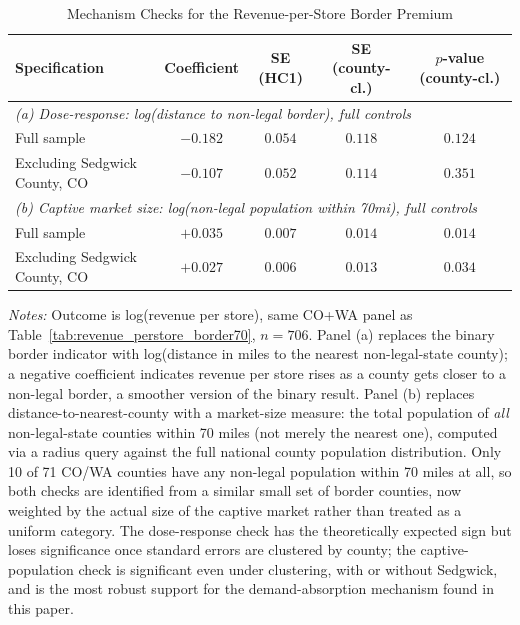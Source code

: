 \begin{table}[htbp]
\centering
\caption{Mechanism Checks for the Revenue-per-Store Border Premium}
\label{tab:revenue_perstore_mechanism}
\begin{tabular}{lcccc}
\toprule
Specification & Coefficient & SE (HC1) & SE (county-cl.) & $p$-value (county-cl.) \\
\midrule
\multicolumn{5}{l}{\textit{(a) Dose-response: log(distance to non-legal border), full controls}} \\
Full sample & $-0.182$ & $0.054$ & $0.118$ & $0.124$ \\
Excluding Sedgwick County, CO & $-0.107$ & $0.052$ & $0.114$ & $0.351$ \\
\midrule
\multicolumn{5}{l}{\textit{(b) Captive market size: log(non-legal population within 70mi), full controls}} \\
Full sample & $+0.035$ & $0.007$ & $0.014$ & $0.014$ \\
Excluding Sedgwick County, CO & $+0.027$ & $0.006$ & $0.013$ & $0.034$ \\
\bottomrule
\end{tabular}
\begin{minipage}{0.95\textwidth}
\vspace{0.3em}
\footnotesize
\textit{Notes:} Outcome is log(revenue per store), same CO+WA panel as Table~\ref{tab:revenue_perstore_border70},
$n=706$. Panel (a) replaces the binary border indicator with log(distance in miles to the nearest
non-legal-state county); a negative coefficient indicates revenue per store rises as a county gets closer
to a non-legal border, a smoother version of the binary result. Panel (b) replaces distance-to-nearest-county
with a market-size measure: the total population of \emph{all} non-legal-state counties within 70 miles
(not merely the nearest one), computed via a radius query against the full national county population
distribution. Only 10 of 71 CO/WA counties have any non-legal population within 70 miles at all, so both
checks are identified from a similar small set of border counties, now weighted by the actual size of the
captive market rather than treated as a uniform category. The dose-response check has the theoretically
expected sign but loses significance once standard errors are clustered by county; the captive-population
check is significant even under clustering, with or without Sedgwick, and is the most robust support for
the demand-absorption mechanism found in this paper.
\end{minipage}
\end{table}

